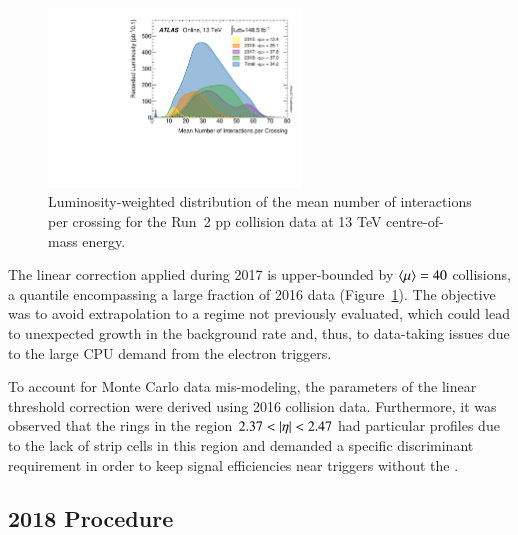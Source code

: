 



%
%



\begin{figure}[h!t]
\centering
\includegraphics[width=0.6\textwidth]{sections/tuning_strategy/figures/mu_2015_2018.pdf}
\caption{\label{fig:mu_2015_2018}
Luminosity-weighted distribution of the mean number of interactions per crossing
for the Run~2 pp collision data at 13 TeV centre-of-mass
energy.~\cite{atlas_lumi_run2_results}}
\end{figure}


The linear correction applied during 2017 is upper-bounded by $\langle \mu \rangle=40$
collisions, a quantile encompassing a large fraction of 2016 data
(Figure~\ref{fig:mu_2015_2018}). The objective was to avoid extrapolation to a
regime not previously evaluated, which could lead to unexpected growth in the
background rate and, thus, to data-taking issues due to the large CPU demand
from the electron triggers.

To account for Monte Carlo data mis-modeling, the parameters of the linear threshold
correction were derived using 2016 collision data. Furthermore, it was observed
that the rings in the region $2.37<\abseta<2.47$ had particular profiles due to
the lack of strip cells in this region and demanded a specific discriminant requirement in order to keep signal efficiencies near triggers without the \rnn{}. 

\FloatBarrier
\subsection{2018 Procedure}\label{ssec:2018}

